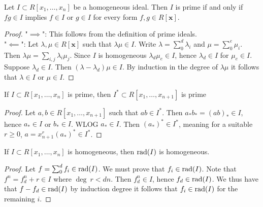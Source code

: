 \begin{lemma}\label{CheckingHomogeneousIdealPrimeSufficesToCheckForms}
    Let $I\subset R[x_1,\dots,x_n]$ be a homogeneous ideal. Then $I$ is prime if and only if $fg\in I$ implies $f\in I$ or $g\in I$ for every form $f,g\in R[\mathbf{x}]$. 
\end{lemma}
\begin{proof}
    "$\implies$": This follows from the definition of prime ideals.\\
    "$\impliedby$": Let $\lambda,\mu\in R[\mathbf{x}]$ such that $\lambda\mu\in I$. Write $\lambda=\sum_0^{d} \lambda_i$ and $\mu = \sum_0^e \mu_i$. Then $\lambda\mu= \sum_{i,j} \lambda_i\mu_j$. Since $I$ is homogeneous $\lambda_d\mu_e\in I$, hence $\lambda_d\in I$ for $\mu_e\in I$. Suppose $\lambda_d\in I$. Then $(\lambda-\lambda_d)\mu \in I$. By induction in the degree of $\lambda \mu$ it follows that $\lambda \in I$ or $\mu\in I$.
\end{proof} 
\begin{lemma}\label{HomogenizationOfPrimeIdealIsPrime}
    If $I\subset R[x_1,\dots,x_n]$ is prime, then $I^\ast\subset R[x_1,\dots,x_{n+1}]$ is prime
\end{lemma}
\begin{proof}
    Let $a,b\in R[x_1,\dots,x_{n+1}]$ such that $ab\in I^\ast$. Then $a_\ast b_\ast = (ab)_\ast \in I$, hence $a_\ast \in I$ or $b_\ast\in I$. WLOG $a_\ast \in I$. Then $(a_\ast)^\ast\in I^\ast$, meaning for a suitable $r\geq 0$, $a=x_{n+1}^r(a_\ast)^\ast \in I^\ast$.
\end{proof}
\begin{proposition}
    If $I\subset R[x_1,\dots,x_n]$ is homogeneous, then $\mathrm{rad}(I)$ is homogeneous.  
\end{proposition}
\begin{proof}
    Let $f=\sum_0^d f_i \in \mathrm{rad}(I)$. We must prove that $f_i\in \mathrm{rad}(I)$. Note that $f^n = f_d^n + r\in I$ where $\deg \ r < dn$. Then $f_d^n\in I$, hence $f_d\in \mathrm{rad}(I)$. We thus have that $f - f_d \in \mathrm{rad}(I)$ by induction degree it follows that $f_i\in \mathrm{rad}(I)$ for the remaining $i$.
\end{proof}

